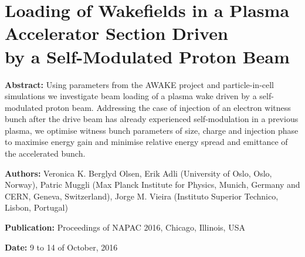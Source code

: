 %
%

\chapter[Loading of Wakefields in a Plasma Accelerator Section Driven by a Self-Modulated\\Proton Beam,
         \emph{Proceedings of NAPAC 2016}]%
        {Loading of Wakefields in a Plasma Accelerator Section Driven\\by a Self-Modulated Proton Beam}
\label{Pub:NAPAC16}

\begin{hangparas}{10mm}{1}

    \textbf{Abstract:}
    Using parameters from the AWAKE project and particle-in-cell simulations we investigate beam loading of a plasma
    wake driven by a self-modulated proton beam. Addressing the case of injection of an electron witness bunch after
    the drive beam has already experienced self-modulation in a previous plasma, we optimise witness bunch parameters of
    size, charge and injection phase to maximise energy gain and minimise relative energy spread and emittance of the
    accelerated bunch.

    \vspace{5mm}

    \textbf{Authors:}
    Veronica K. Berglyd Olsen, Erik Adli (University of Oslo, Oslo, Norway),
    Patric Muggli (Max Planck Institute for Physics, Munich, Germany and CERN, Geneva, Switzerland),
    Jorge M. Vieira (Instituto Superior Technico, Lisbon, Portugal)

    \vspace{5mm}

    \textbf{Publication:}
    Proceedings of NAPAC 2016, Chicago, Illinois, USA \cite{berglyd_olsen:2016}

    \vspace{5mm}

    \textbf{Date:} 9 to 14 of October, 2016


\end{hangparas}

